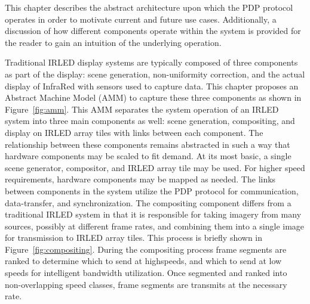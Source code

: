 \label{chap:machine_model}


This chapter describes the abstract architecture upon which the PDP protocol operates in order to motivate current and future use cases. Additionally, a discussion of how different components operate within the system is provided for the reader to gain an intuition of the underlying operation.

Traditional IRLED display systems are typically composed of three components as part of the display: scene generation, non-uniformity correction, and the actual display of InfraRed with sensors used to capture data. This chapter proposes an Abstract Machine Model (AMM) to capture these three components as shown in Figure~\ref{fig:amm}. This AMM separates the system operation of an IRLED system into three main components as well: scene generation, compositing, and display on IRLED array tiles with links between each component. The relationship between these components remains abstracted in such a way that hardware components may be scaled to fit demand. At its most basic, a single scene generator, compositor, and IRLED array tile may be used. For higher speed requirements, hardware components may be mapped as needed. The links between components in the system utilize the PDP protocol for communication, data-transfer, and synchronization. The compositing component differs from a traditional IRLED system in that it is responsible for taking imagery from many sources, possibly at different frame rates, and combining them into a single image for transmission to IRLED array tiles. This process is briefly shown in Figure~\ref{fig:compositing}. During the compositing process frame segments are ranked to determine which to send at highspeeds, and which to send at low speeds for intelligent bandwidth utilization. Once segmented and ranked into non-overlapping speed classes, frame segments are transmits at the necessary rate.

